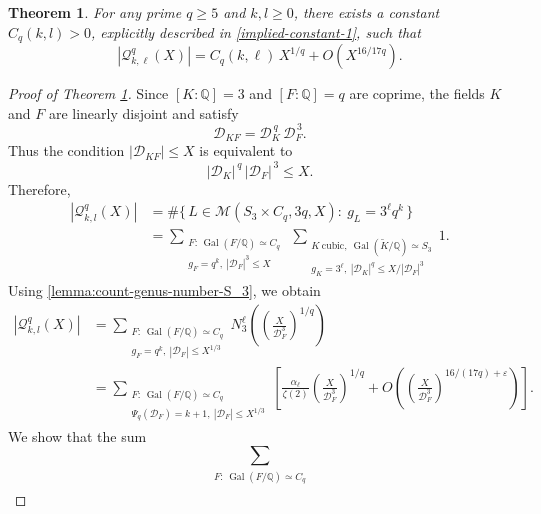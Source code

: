 \documentclass[10pt,a4paper]{amsart}
\newtheorem{theorem}{Theorem}
\DeclareMathOperator{\Gal}{Gal}
\newcommand{\cM}{\mathcal{M}}
\newcommand{\cQ}{\mathcal{Q}}
\begin{document}
\begin{theorem}\label{S_3-C_q-theorem}
    For any prime $q\geq 5$ and $k,l\geq 0$, there exists a constant $C_q(k,l)>0$, explicitly described in \eqref{implied-constant-1}, such that
    \begin{equation*}
        |\cQ^q_{k,\ell}(X)| = C_q(k,\ell) \, X^{1/q} + O\left(X^{16/17q}\right).
    \end{equation*}
\end{theorem}

\begin{proof}[Proof of Theorem \ref{S_3-C_q-theorem}]
Since $[K:\mathbb{Q}]=3$ and $[F:\mathbb{Q}]=q$ are coprime, the fields $K$ and
$F$ are linearly disjoint and satisfy
\[
    \mathcal{D}_{KF}
    = \mathcal{D}_{K}^{\,q}\, \mathcal{D}_{F}^{\,3}.
\]
Thus the condition $|\mathcal{D}_{KF}|\le X$ is equivalent to
\[
    |\mathcal{D}_K|^{\,q}\,|\mathcal{D}_F|^{\,3} \le X.
\]
Therefore,
\begin{align*}
    |\cQ^q_{k,l}(X)|
    &= 
    \#\bigl\{\, L \in \cM(S_3\times C_q, 3q, X) : \ g_L = 3^{\ell}q^{k} \,\bigr\} \\
    &=
    \sum_{\substack{
        F:\, \Gal(F/\mathbb{Q})\simeq C_q\\
        g_F = q^{k},\ |\mathcal{D}_F|^{3}\le X}}
    \
    \sum_{\substack{
        K\ \text{cubic},\ \Gal(\widetilde{K}/\mathbb{Q})\simeq S_3\\
        g_K = 3^{\ell},\ |\mathcal{D}_K|^{q}\le X/|\mathcal{D}_F|^{3}}}
    1.
\end{align*}
Using \eqref{lemma:count-genus-number-S_3}, we obtain
\begin{align}\label{eqn-a-1}
    |\cQ^q_{k,l}(X)|
    &= 
    \sum_{\substack{
        F:\, \Gal(F/\mathbb{Q})\simeq C_q\\
        g_F = q^{k},\ |\mathcal{D}_F|\le X^{1/3}}}
    N_3^{\ell}\!\left( \left(\frac{X}{\mathcal{D}_F^3}\right)^{1/q} \right) \nonumber\\[6pt]
    &=
    \sum_{\substack{
        F:\, \Gal(F/\mathbb{Q})\simeq C_q\\
        \Psi_q(\mathcal{D}_F)=k+1,\ |\mathcal{D}_F|\le X^{1/3}}}
    \left[
        \frac{\alpha_\ell}{\zeta(2)}
        \left(\frac{X}{\mathcal{D}_F^3}\right)^{1/q}
        + O\!\left(
            \left(\frac{X}{\mathcal{D}_F^3}\right)^{16/(17q)+\varepsilon}
        \right)
    \right].
\end{align}
We show that the sum
\begin{equation}\label{eqn-sum}
    \sum_{\substack{
        F:\, \Gal(F/\mathbb{Q})\simeq C_q\\
}}
\end{equation}
\end{proof}
\end{document}

